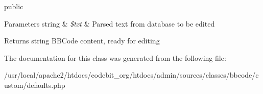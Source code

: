 public 
\begin{DoxyParams}[1]{Parameters}
string & {\em \$txt} & Parsed text from database to be edited \\
\hline
\end{DoxyParams}
\begin{DoxyReturn}{Returns}
string B\-B\-Code content, ready for editing 
\end{DoxyReturn}


The documentation for this class was generated from the following file\-:\begin{DoxyCompactItemize}
\item 
/usr/local/apache2/htdocs/codebit\-\_\-org/htdocs/admin/sources/classes/bbcode/custom/defaults.\-php\end{DoxyCompactItemize}
